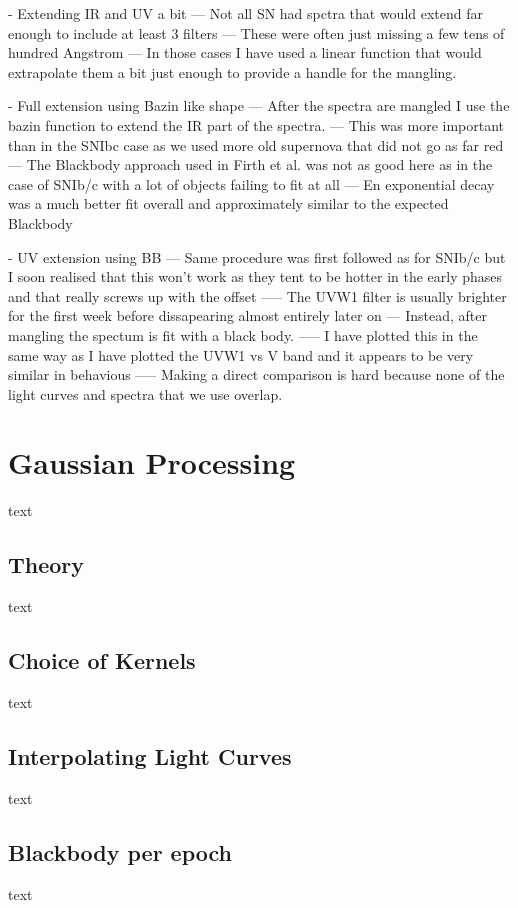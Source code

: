 - Extending IR and UV a bit
--- Not all SN had spctra that would extend far enough to include at least 3 filters
--- These were often just missing a few tens of hundred Angstrom
--- In those cases I have used a linear function that would extrapolate them a bit just enough to provide a handle for the mangling.

- Full extension using Bazin like shape
--- After the spectra are mangled I use the bazin function to extend the IR part of the spectra.
--- This was more important than in the SNIbc case as we used more old supernova that did not go as far red
--- The Blackbody approach used in Firth et al. was not as good here as in the case of SNIb/c with a lot of objects failing to fit at all
--- En exponential decay was a much better fit overall and approximately similar to the expected Blackbody

- UV extension using BB
--- Same procedure was first followed as for SNIb/c but I soon realised that this won't work as they tent to be hotter in the early phases and that really screws up with the offset
----- The UVW1 filter is usually brighter for the first week before dissapearing almost entirely later on
--- Instead, after mangling the spectum is fit with a black body.
----- I have plotted this in the same way as I have plotted the UVW1 vs V band and it appears to be very similar in behavious
----- Making a direct comparison is hard because none of the light curves and spectra that we use overlap.

\section{Gaussian Processing}
text
\subsection{Theory}
text
\subsection{Choice of Kernels}
text
\subsection{Interpolating Light Curves}
text
\subsection{Blackbody per epoch}
text
